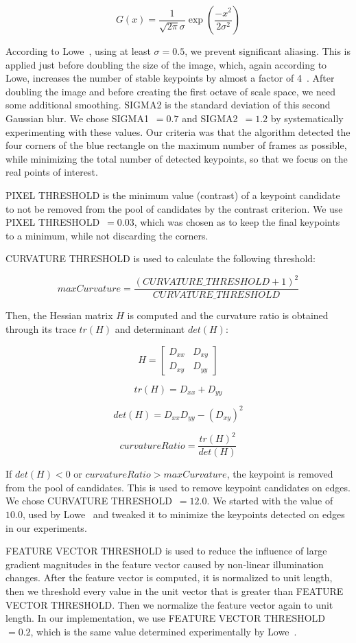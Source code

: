 \documentclass[]{IEEEtran}
\begin{document}
  \[G(x) = \frac{1}{\sqrt{2 \pi} \sigma} \exp(\frac{-x^2}{2 \sigma^2})\]

  According to Lowe~\cite{ijcv04}, using at least $\sigma = 0.5$, we prevent significant aliasing. This is applied just before doubling the size of the image, which, again according to Lowe, increases the number of stable keypoints by almost a factor of 4~\cite{ijcv04}. After doubling the image and before creating the first octave of scale space, we need some additional smoothing. SIGMA2 is the standard deviation of this second Gaussian blur. We chose SIGMA1~$= 0.7$ and SIGMA2~$= 1.2$ by systematically experimenting with these values. Our criteria was that the algorithm detected the four corners of the blue rectangle on the maximum number of frames as possible, while minimizing the total number of detected keypoints, so that we focus on the real points of interest.

  PIXEL THRESHOLD is the minimum value (contrast) of a keypoint candidate to not be removed from the pool of candidates by the contrast criterion. We use PIXEL THRESHOLD~$= 0.03$, which was chosen as to keep the final keypoints to a minimum, while not discarding the corners.

  CURVATURE THRESHOLD is used to calculate the following threshold:

  \[maxCurvature = \frac{(CURVATURE\_THRESHOLD + 1) ^ 2} {CURVATURE\_THRESHOLD}\]

  Then, the Hessian matrix $H$ is computed and the curvature ratio is obtained through its trace $tr(H)$ and determinant $det(H)$:

  \[H =
  \begin{bmatrix}
     D_{xx} & D_{xy} \\
     D_{xy} & D_{yy}
  \end{bmatrix}\]

  \[tr(H) = D_{xx} + D_{yy}\]

  \[det(H) = D_{xx} D_{yy} - (D_{xy}) ^ 2\]

  \[curvatureRatio = \frac{tr(H) ^ 2}{det(H)}\]

  If $det(H) < 0$ or $curvatureRatio > maxCurvature$, the keypoint is removed from the pool of candidates. This is used to remove keypoint candidates on edges. We chose CURVATURE THRESHOLD~$= 12.0$. We started with the value of $10.0$, used by Lowe~\cite{ijcv04} and tweaked it to minimize the keypoints detected on edges in our experiments.

  FEATURE VECTOR THRESHOLD is used to reduce the influence of large gradient magnitudes in the feature vector caused by non-linear illumination changes. After the feature vector is computed, it is normalized to unit length, then we threshold every value in the unit vector that is greater than FEATURE VECTOR THRESHOLD. Then we normalize the feature vector again to unit length. In our implementation, we use FEATURE VECTOR THRESHOLD~$= 0.2$, which is the same value determined experimentally by Lowe~\cite{ijcv04}.
\end{document}
